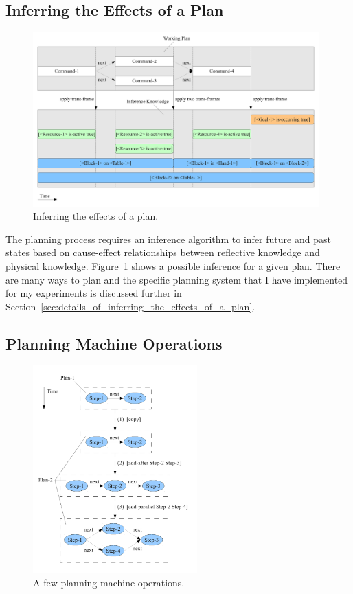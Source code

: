\subsection{Inferring the Effects of a Plan}
\label{sec:inferring_the_effects_of_a_plan}

\begin{figure}[bth]
  \center
  \includegraphics[width=11cm]{gfx/infer_plan_effects}
  \caption[Inferring the effects of a plan]{Inferring the effects of
    a plan.}
  \label{fig:infer_plan_effects}
\end{figure}

The planning process requires an inference algorithm to infer future
and past states based on cause-effect relationships between reflective
knowledge and physical knowledge.  Figure~\ref{fig:infer_plan_effects}
shows a possible inference for a given plan.  There are many ways to
plan and the specific planning system that I have implemented for my
experiments is discussed further in
Section~\ref{sec:details_of_inferring_the_effects_of_a_plan}.


\subsection{Planning Machine Operations}

\begin{figure}[bth]
  \center
  \includegraphics[height=8cm]{gfx/planning_machine_operations}
  \caption[A few planning machine operations]{A few planning machine operations.}
  \label{fig:planning_machine_operations}
\end{figure}

